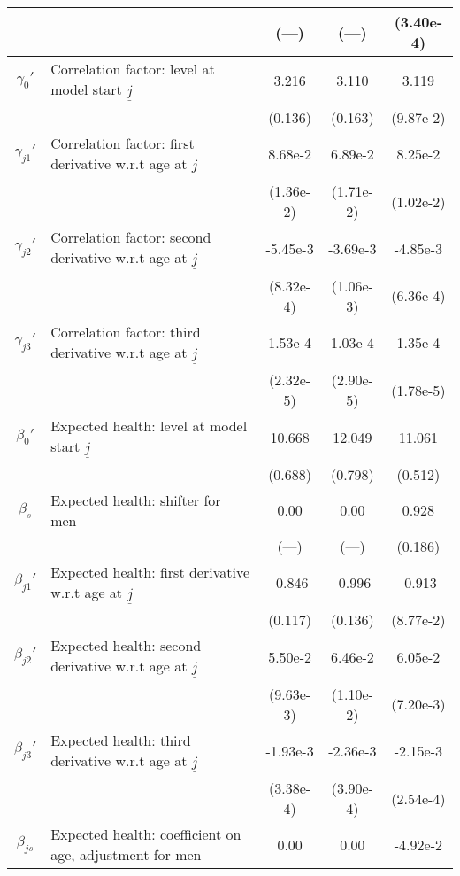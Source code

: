 \begin{table}
\begin{center}
{\begin{tabular}{clccc}
\rule{0pt}{2.2ex} & & (---) & (---) & (3.40e-4) \\
\hline
\rule{0pt}{2.2ex}$\gamma_{0}'$ & Correlation factor: level at model start $\underline{j}$ & 3.216 & 3.110 & 3.119 \\
\rule{0pt}{2.2ex} & & (0.136) & (0.163) & (9.87e-2) \\
\rule{0pt}{2.2ex}$\gamma_{j1}'$ & Correlation factor: first derivative w.r.t age at $\underline{j}$ & 8.68e-2 & 6.89e-2 & 8.25e-2 \\
\rule{0pt}{2.2ex} & & (1.36e-2) & (1.71e-2) & (1.02e-2) \\
\rule{0pt}{2.2ex}$\gamma_{j2}'$ & Correlation factor: second derivative w.r.t age at $\underline{j}$ & -5.45e-3 & -3.69e-3 & -4.85e-3 \\
\rule{0pt}{2.2ex} & & (8.32e-4) & (1.06e-3) & (6.36e-4) \\
\rule{0pt}{2.2ex}$\gamma_{j3}'$ & Correlation factor: third derivative w.r.t age at $\underline{j}$ & 1.53e-4 & 1.03e-4 & 1.35e-4 \\
\rule{0pt}{2.2ex} & & (2.32e-5) & (2.90e-5) & (1.78e-5) \\
\hline
\rule{0pt}{2.2ex}$\beta_{0}'$ & Expected health: level at model start $\underline{j}$ & 10.668 & 12.049 & 11.061 \\
\rule{0pt}{2.2ex} & & (0.688) & (0.798) & (0.512) \\
\rule{0pt}{2.2ex}$\beta_{s}$ & Expected health: shifter for men & 0.00 & 0.00 & 0.928 \\
\rule{0pt}{2.2ex} & & (---) & (---) & (0.186) \\
\rule{0pt}{2.2ex}$\beta_{j1}'$ & Expected health: first derivative w.r.t age at $\underline{j}$ & -0.846 & -0.996 & -0.913 \\
\rule{0pt}{2.2ex} & & (0.117) & (0.136) & (8.77e-2) \\
\rule{0pt}{2.2ex}$\beta_{j2}'$ & Expected health: second derivative w.r.t age at $\underline{j}$ & 5.50e-2 & 6.46e-2 & 6.05e-2 \\
\rule{0pt}{2.2ex} & & (9.63e-3) & (1.10e-2) & (7.20e-3) \\
\rule{0pt}{2.2ex}$\beta_{j3}'$ & Expected health: third derivative w.r.t age at $\underline{j}$ & -1.93e-3 & -2.36e-3 & -2.15e-3 \\
\rule{0pt}{2.2ex} & & (3.38e-4) & (3.90e-4) & (2.54e-4) \\
\rule{0pt}{2.2ex}$\beta_{js}$ & Expected health: coefficient on age, adjustment for men & 0.00 & 0.00 & -4.92e-2 \\

\end{tabular}}
\end{center}
\end{table}

